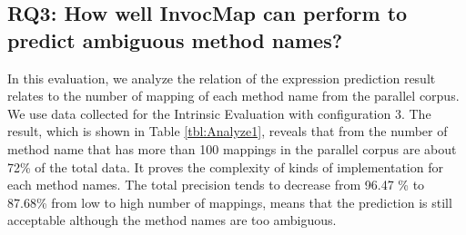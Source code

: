 \subsection{RQ3: How well InvocMap can perform to predict ambiguous method names?}

In this evaluation, we analyze the relation of the expression prediction result relates to the number of mapping of each method name from the parallel corpus. We use data collected for the Intrinsic Evaluation with configuration 3. The result, which is shown in Table \ref{tbl:Analyze1}, reveals that from the number of method name that has more than 100 mappings in the parallel corpus are about 72\% of the total data. It proves the complexity of kinds of implementation for each method names. The total precision tends to decrease from 96.47 \% to 87.68\% from low to high number of mappings, means that the prediction is still acceptable although the method names are too ambiguous.








